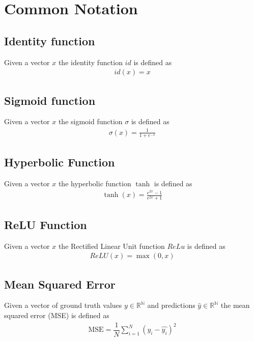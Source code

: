\chapter{Common Notation}

\section{Identity function}
Given a vector $x$ the identity function $id$ is defined as 
\begin{gather}
    \label{identity}
    id(x) = x
\end{gather}

\section{Sigmoid function}
Given a vector $x$ the sigmoid function $\sigma$ is defined as 
\begin{gather}
    \label{sigmoid}
    \sigma(x) = \frac {1} {1 + e^{-x}}
\end{gather}

\section{Hyperbolic Function}
Given a vector $x$ the hyperbolic function $\tanh$ is defined as 
\begin{gather}
    \label{tanh}
    \tanh(x) = \frac {e^{2x} -1} {e^{2x} +1}
\end{gather}

\section{ReLU Function}
Given a vector $x$ the Rectified Linear Unit function $ReLu$ is defined as 
\begin{gather}
    \label{relu}
    ReLU(x) = \max(0, x)
\end{gather}

\section{Mean Squared Error}
Given a vector of ground truth values $y \in \mathbb{R^N}$ and predictions $\widehat{y} \in \mathbb{R^N}$ the mean squared error (MSE) is defined as 
\begin{gather}
\label{mse}
    \text{MSE}=
        \dfrac
            {1}
            {N}
            \sum\limits_{i=1}^{N}  (y_i - \hat{y_i})^2
\end{gather}

